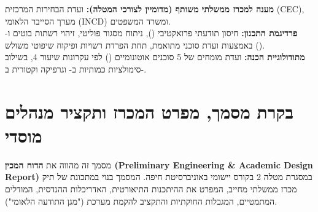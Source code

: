 \documentclass{civicshield}
\begin{document}
\begin{titlepage}
\begin{otherlanguage}{english}
\vspace{0.55cm}
\begin{center}
\begin{tcolorbox}[colback=CivicGrayBg, colframe=CivicNavy, width=0.92\textwidth, arc=4pt, boxrule=1pt, left=12pt, right=12pt, top=10pt, bottom=10pt]
\begin{otherlanguage}{hebrew}
\textbf{\textcolor{CivicNavy}{מענה למכרז ממשלתי משותף (מדומיין לצורכי המטלה):}}
ועדת הבחירות המרכזית (CEC), מערך הסייבר הלאומי (INCD) ומשרד המשפטים.\\[4pt]
\textbf{\textcolor{CivicNavy}{פרדיגמת התכנון:}}
חיסון תודעתי פרואקטיבי (), ניתוח מסגור פוליטי, זיהוי רשתות בוטים ו- באמצעות ועדת סוכני  מתואמת, תחת הפרדת רשויות ופיקוח שיפוטי משולש ().\\[4pt]
\textbf{\textcolor{CivicNavy}{מתודולוגיית הכנה:}}
ועדת מומחים של 5 סוכנים אוטונומיים () לפי עקרונות שיעור 4, בשילוב סימולציות כמותיות ב- וגרפיקה וקטורית ב-.
\end{otherlanguage}
\end{tcolorbox}
\end{center}

\end{otherlanguage}
\end{titlepage}

\clearpage
\chapter*{בקרת מסמך, מפרט המכרז ותקציר מנהלים מוסדי}

\begin{rfpbox}
מסמך זה מהווה את \textbf{הדוח המכין (Preliminary Engineering \& Academic Design Report)} במסגרת מטלה 2 בקורס יישומי  באוניברסיטת חיפה. המסמך בנוי במתכונת של תיק מכרז ממשלתי מחייב, המפרט את ההיתכנות התיאורטית, האדריכלות ההנדסית, המודלים המתמטיים, המגבלות החוקתיות והתקציב להקמת מערכת  ("מגן התודעה הלאומי").
\end{rfpbox}
\end{document}
